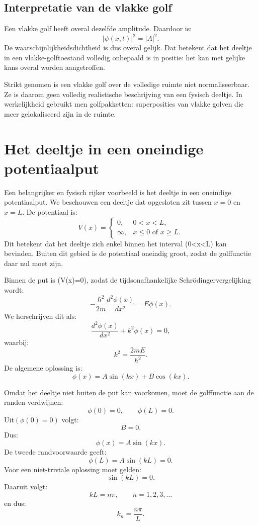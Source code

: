 \documentclass{report} %
\begin{document}
    \subsection{Interpretatie van de vlakke golf}

    Een vlakke golf heeft overal dezelfde amplitude. Daardoor is:
    \[
        |\psi(x,t)|^2=|A|^2.
    \]
    De waarschijnlijkheidsdichtheid is dus overal gelijk. Dat betekent dat het deeltje in een vlakke-golftoestand volledig onbepaald is in positie: het kan met gelijke kans overal worden aangetroffen.

    Strikt genomen is een vlakke golf over de volledige ruimte niet normaliseerbaar. Ze is daarom geen volledig realistische beschrijving van een fysisch deeltje. In werkelijkheid gebruikt men golfpakketten: superposities van vlakke golven die meer gelokaliseerd zijn in de ruimte.


    \section{Het deeltje in een oneindige potentiaalput}

    Een belangrijker en fysisch rijker voorbeeld is het deeltje in een oneindige
    potentiaalput. We beschouwen een deeltje dat opgesloten zit tussen \(x=0\) en
    \(x=L\). De potentiaal is:
    \[
        V(x)=
        \begin{cases}
            0, & 0<x<L,\\
            \infty, & x\leq 0 \text{ of } x\geq L.
        \end{cases}
    \]
    Dit betekent dat het deeltje zich enkel binnen het interval (0<x<L) kan bevinden. Buiten dit gebied is de potentiaal oneindig groot, zodat de golffunctie daar nul moet zijn.

    Binnen de put is (V(x)=0), zodat de tijdsonafhankelijke Schrödingervergelijking wordt:
    \[
        -\frac{\hbar^2}{2m}\frac{d^2\phi(x)}{dx^2}=E\phi(x).
    \]
    We herschrijven dit als:
    \[
        \frac{d^2\phi(x)}{dx^2}+k^2\phi(x)=0,
    \]
    waarbij:
    \[
        k^2=\frac{2mE}{\hbar^2}.
    \]
    De algemene oplossing is:
    \[
        \phi(x)=A\sin(kx)+B\cos(kx).
    \]

    Omdat het deeltje niet buiten de put kan voorkomen, moet de golffunctie aan de randen verdwijnen:
    \[
        \phi(0)=0,
        \qquad
        \phi(L)=0.
    \]
    Uit$ (\phi(0)=0)$ volgt:
    \[
        B=0.
    \]
    Dus:
    \[
        \phi(x)=A\sin(kx).
    \]
    De tweede randvoorwaarde geeft:
    \[
        \phi(L)=A\sin(kL)=0.
    \]
    Voor een niet-triviale oplossing moet gelden:
    \[
        \sin(kL)=0.
    \]
    Daaruit volgt:
    \[
        kL=n\pi,
        \qquad n=1,2,3,\ldots
    \]
    en dus:
    \[
        k_n=\frac{n\pi}{L}.
    \]
\end{document}
